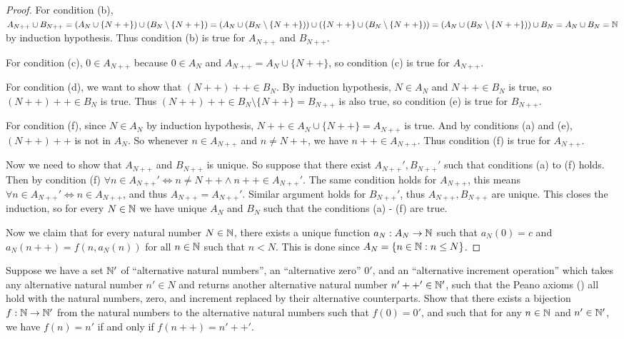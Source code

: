 \begin{proof}
  For condition (b), \(A_{N++} \cup B_{N++} = (A_N \cup \{N++\}) \cup (B_N \setminus \{N++\}) = (A_N \cup (B_N \setminus \{N++\})) \cup (\{N++\} \cup (B_N \setminus \{N++\})) = (A_N \cup (B_N \setminus \{N++\})) \cup B_N = A_N \cup B_N = \mathbb{N}\) by induction hypothesis.
  Thus condition (b) is true for \(A_{N++}\) and \(B_{N++}\).

  For condition (c), \(0 \in A_{N++}\) because \(0 \in A_N\) and \(A_{N++} = A_N \cup \{N++\}\), so condition (c) is true for \(A_{N++}\).

  For condition (d), we want to show that \((N++)++ \in B_N\).
  By induction hypothesis, \(N \in A_N\) and \(N++ \in B_N\) is true, so \((N++)++ \in B_N\) is true.
  Thus \((N++)++ \in B_N \setminus \{N++\} = B_{N++}\) is also true, so condition (e) is true for \(B_{N++}\).

  For condition (f), since \(N \in A_N\) by induction hypothesis, \(N++ \in A_N \cup \{N++\} = A_{N++}\) is true.
  And by conditions (a) and (e), \((N++)++\) is not in \(A_N\).
  So whenever \(n \in A_{N++}\) and \(n \neq N++\), we have \(n++ \in A_{N++}\).
  Thus condition (f) is true for \(A_{N++}\).

  Now we need to show that \(A_{N++}\) and \(B_{N++}\) is unique.
  So suppose that there exist \(A_{N++}', B_{N++}'\) such that conditions (a) to (f) holds.
  Then by condition (f) \(\forall n \in A_{N++}' \iff n \neq N++ \land n++ \in A_{N++}'\).
  The same condition holds for \(A_{N++}\), this means \(\forall n \in A_{N++}' \iff n \in A_{N++}\), and thus \(A_{N++} = A_{N++}'\).
  Similar argument holds for \(B_{N++}'\), thus \(A_{N++}, B_{N++}\) are unique.
  This closes the induction, so for every \(N \in \mathbb{N}\) we have unique \(A_N\) and \(B_N\) such that the conditions (a) - (f) are true.

  Now we claim that for every natural number \(N \in \mathbb{N}\), there exists a unique function \(a_N : A_N \to \mathbb{N}\) such that \(a_N(0) = c\) and \(a_N(n++) = f(n, a_{N}(n))\) for all \(n \in \mathbb{N}\) such that \(n < N\).
  This is done since \(A_N = \{n \in \mathbb{N} : n \leq N\}\).
\end{proof}

\begin{ex}\label{ex:3.5.13}
  Suppose we have a set \(\mathbb{N}'\) of ``alternative natural numbers'', an ``alternative zero'' \(0'\), and an ``alternative increment operation'' which takes any alternative natural number \(n' \in N\) and returns another alternative natural number \(n'++' \in \mathbb{N}'\), such that the Peano axioms () all hold with the natural numbers, zero, and increment replaced by their alternative counterparts.
  Show that there exists a bijection \(f : \mathbb{N} \to \mathbb{N}'\) from the natural numbers to the alternative natural numbers such that \(f(0) = 0'\), and such that for any \(n \in \mathbb{N}\) and \(n' \in \mathbb{N}'\), we have \(f(n) = n'\) if and only if \(f(n++) = n'++'\).
\end{ex}

